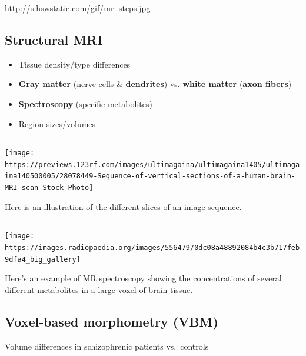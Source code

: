 \documentclass[]{article}
\providecommand{\tightlist}{%
  \setlength{\itemsep}{0pt}\setlength{\parskip}{0pt}}
\begin{document}
\url{http://s.hswstatic.com/gif/mri-steps.jpg}

\hypertarget{structural-mri}{%
\subsection{\texorpdfstring{\textbf{Structural
MRI}}{Structural MRI}}\label{structural-mri}}

\begin{itemize}
\tightlist
\item
  Tissue density/type differences
\item
  \textbf{Gray matter} (nerve cells \& \textbf{dendrites}) vs.
  \textbf{white matter} (\textbf{axon fibers})
\item
  \textbf{Spectroscopy} (specific metabolites)
\item
  Region sizes/volumes
\end{itemize}

\begin{center}\rule{0.5\linewidth}{\linethickness}\end{center}

\begin{center}\texttt{[image: https://previews.123rf.com/images/ultimagaina/ultimagaina1405/ultimagaina140500005/28078449-Sequence-of-vertical-sections-of-a-human-brain-MRI-scan-Stock-Photo]} \end{center}

Here is an illustration of the different slices of an image sequence.

\begin{center}\rule{0.5\linewidth}{\linethickness}\end{center}

\begin{center}\texttt{[image: https://images.radiopaedia.org/images/556479/0dc08a48892084b4c3b717feb9dfa4\_big\_gallery]} \end{center}

Here's an example of MR spectroscopy showing the concentrations of
several different metabolites in a large voxel of brain tissue.

\hypertarget{voxel-based-morphometry-vbm}{%
\subsection{\texorpdfstring{\textbf{Voxel-based morphometry
(VBM)}}{Voxel-based morphometry (VBM)}}\label{voxel-based-morphometry-vbm}}

Volume differences in schizophrenic patients vs.~controls
\end{document}
